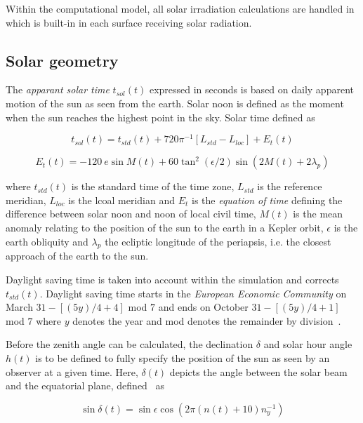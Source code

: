 Within the computational model, all solar irradiation calculations are handled in  which is built-in in each surface receiving solar radiation.

\subsection{Solar geometry}

The \emph{apparant solar time} $t_{sol}(t)$ expressed in seconds is based on daily apparent motion of the sun as seen from the earth. Solar noon is defined as the moment when the sun reaches the highest point in the sky. Solar time defined as

\begin{equation}
t_{sol}(t) = t_{std}(t) + 720\pi^{-1}\left[L_{std}-L_{loc}\right] + E_{t}(t)
\end{equation}

\begin{equation}
E_{t}(t) = -120\ e\sin M(t) + 60\tan^{2} \left(\epsilon/2\right) \sin \left(2M(t)+2\lambda_{p}\right)
\end{equation}

where $t_{std}(t)$ is the standard time of the time zone, $L_{std}$ is the reference meridian, $L_{loc}$ is the lcoal meridian and $E_{t}$ is the \emph{equation of time} defining the difference between solar noon and noon of local civil time, $M(t)$ is the mean anomaly relating to the position of the sun to the earth in a Kepler orbit, $\epsilon$ is the earth obliquity and $\lambda_{p}$ the ecliptic longitude of the periapsis, i.e. the closest approach of the earth to the sun.

Daylight saving time is taken into account within the simulation and corrects $t_{std}(t)$. Daylight saving time starts in the \emph{European Economic Community} on March $31-\left[(5y)/4+4\right]$ mod $7$ and ends on October $31-\left[(5y)/4+1\right]$ mod $7$ where $y$ denotes the year and mod denotes the remainder by division~\cite{VanGent2011}.

Before the zenith angle can be calculated, the declination $\delta$ and solar hour angle $h(t)$ is to be defined to fully specify the position of the sun as seen by an observer at a given time. Here, $\delta(t)$ depicts the angle between the solar beam and the equatorial plane, defined~\cite{Spencer1971} as 

\begin{equation}
\sin \delta(t) = \sin \epsilon \cos \left(2\pi \left(n(t)+10\right) n_{y}^{-1} \right)
\end{equation}


